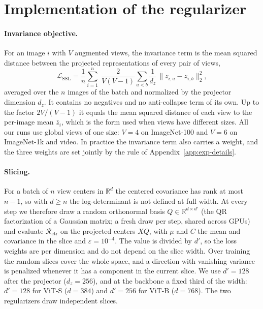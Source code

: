 \section{Implementation of the regularizer}
\label{app:slicing}

\paragraph{Invariance objective.}
For an image $i$ with $V$ augmented views, the invariance term is the mean squared distance between the projected representations of every pair of views,
\[
\mathcal L_{\mathrm{SSL}}
=
\frac{1}{n}\sum_{i=1}^{n}\;\frac{2}{V(V-1)}\sum_{a<b}\frac{1}{d_z}\,\|z_{i,a}-z_{i,b}\|_2^2 ,
\]
averaged over the $n$ images of the batch and normalized by the projector dimension $d_z$. It contains no negatives and no anti-collapse term of its own. Up to the factor $2V/(V-1)$ it equals the mean squared distance of each view to the per-image mean $\bar z_i$, which is the form used when views have different sizes. All our runs use global views of one size: $V{=}4$ on ImageNet-100 and $V{=}6$ on ImageNet-1k and video. In practice the invariance term also carries a weight, and the three weights are set jointly by the rule of Appendix~\ref{app:exp-details}.

\paragraph{Slicing.}
For a batch of $n$ view centers in $\mathbb R^{d}$ the centered covariance has rank at most $n-1$, so with $d \ge n$ the log-determinant is not defined at full width. At every step we therefore draw a random orthonormal basis $Q\in\mathbb R^{d\times d'}$ (the QR factorization of a Gaussian matrix; a fresh draw per step, shared across GPUs) and evaluate $\mathcal R_{\mathrm{ctr}}$ on the projected centers $XQ$, with $\mu$ and $C$ the mean and covariance in the slice and $\varepsilon=10^{-4}$. The value is divided by $d'$, so the loss weights are per dimension and do not depend on the slice width. Over training the random slices cover the whole space, and a direction with vanishing variance is penalized whenever it has a component in the current slice. We use $d'=128$ after the projector ($d_z=256$), and at the backbone a fixed third of the width: $d'=128$ for ViT-S ($d=384$) and $d'=256$ for ViT-B ($d=768$). The two regularizers draw independent slices.

